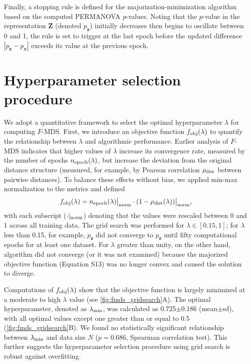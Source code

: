 \documentclass[11pt]{article}
\newcommand{\1}{{\rm 1}\kern-0.24em{\rm I}}
\begin{document}
Finally, a stopping rule is defined for the majorization-minimization algorithm based on the computed PERMANOVA \textit{p}-values. 
Noting that the $p$-value in the representation $\mathbf{Z}$ (denoted $p_\mathbf{z}$) initially decreases then begins to oscillate between 0 and 1, the rule is set to trigger at the last epoch before the updated difference $|p_\mathbf{z} - p_\mathbf{x}|$ exceeds its value at the previous epoch. 
\clearpage


\section{Hyperparameter selection procedure}

We adopt a quantitative framework to select the optimal hyperparameter $\lambda$ for computing $F$-MDS. 
First, we introduce an objective function $f_{\rm obj}(\lambda)$ to quantify the relationship between $\lambda$ and algorithmic performance.
Earlier analysis of $F$-MDS indicates that higher values of $\lambda$ increase its convergence rate, measured by the number of epochs $n_{\rm epoch}(\lambda)$, but increase the deviation from the original distance structure (measured, for example, by Pearson correlation $\rho_{\rm dist}$ between pairwise distances).
To balance these effects without bias, we applied min-max normalization to the metrics and defined
\begin{equation}
    f_{\rm obj}(\lambda) = n_{\rm epoch}(\lambda) \big|_{\rm norm} \cdot (1- \rho_{\rm dist}(\lambda)) \big|_{\rm norm},
    \label{eq:def_grid_search}
\end{equation}
with each subscript ($\cdot|_{\rm norm}$) denoting that the values were rescaled between 0 and 1 across all training data. 
The grid search was performed for $\lambda\in[0.15,1]$; for $\lambda$ less than 0.15, for example, $p_\mathbf{z}$ did not converge to $p_\mathbf{z}$ until fifty computational epochs for at least one dataset. For $\lambda$ greater than unity, on the other hand, algorithm did not converge (or it was not examined) because the majorized objective function (Equation S13) was no longer convex and caused the solution to diverge. 

Computations of $f_{\rm obj}(\lambda)$ show that the objective function is largely minimized at a moderate to high $\lambda$ value (see \ref{fig:fmds_gridsearch}A). The optimal hyperparameter, denoted as $\lambda_{\rm min}$, was calculated as 0.725$\pm$0.186 (mean$\pm$sd), with all optimal values except one greater than or equal to 0.5 (\ref{fig:fmds_gridsearch}B). We found no statistically significant relationship between $\lambda_{\rm min}$ and data size $N$ ($p = 0.686$, Spearman correlation test). This further suggests the hyperparameter selection procedure using grid search is robust against overfitting.
\end{document}
